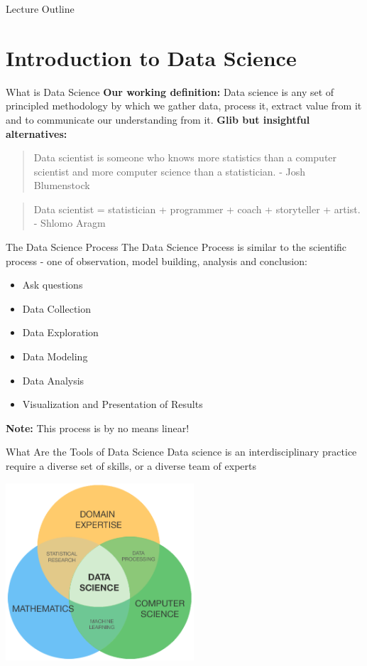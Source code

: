 \documentclass[12pt,t]{beamer}
\begin{document}
\begin{frame}{Lecture Outline}
\tableofcontents
\end{frame}


\section{Introduction to Data Science}

\begin{frame}{What is Data Science}
\textbf{Our working definition:} Data science is any set of principled methodology by which we gather data, process it, extract value from it and to communicate our understanding from it. 
\vskip0.2cm
\textbf{Glib but insightful alternatives:}
\begin{quote}
Data scientist is someone who knows more statistics than a computer scientist and more computer science than a statistician. - Josh Blumenstock
\end{quote}
\begin{quote}
Data scientist = statistician + programmer + coach + storyteller + artist. - Shlomo Aragm
\end{quote}
\end{frame}

\begin{frame}{The Data Science Process}
The Data Science Process is similar to the scientific process - one of observation, model building, analysis and conclusion:
\vskip0.2cm
\begin{itemize}
\item Ask questions
\item  Data Collection
\item  Data Exploration
\item  Data Modeling
\item  Data Analysis
\item  Visualization and Presentation of Results 
\end{itemize}
\vskip0.2cm
\textbf{Note:} This process is by no means linear!
\end{frame}

\begin{frame}{What Are the Tools of Data Science}
\vskip-0.4cm
Data science is an interdisciplinary practice require a diverse set of skills, or a diverse team of experts
\begin{center}
  \includegraphics[width=70mm]{datascience}
  \end{center}
\end{frame}
\end{document}
